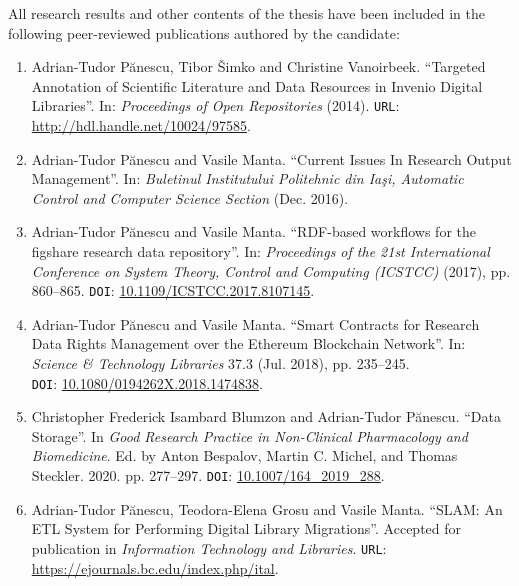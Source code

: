 All research results and other contents of the thesis have been included in the following peer-reviewed publications authored by the candidate:
\begin{enumerate}
    \item Adrian-Tudor P\u{a}nescu, Tibor \v{S}imko and Christine Vanoirbeek. ``Targeted Annotation of Scientific Literature and Data Resources in Invenio Digital Libraries''. In: \emph{Proceedings of Open Repositories} (2014). \texttt{URL}: \url{http://hdl.handle.net/10024/97585}.
    
    \item Adrian-Tudor P\u{a}nescu and Vasile Manta. ``Current Issues In Research Output Management''. In: \emph{Buletinul Institutului Politehnic din Ia\c{s}i, Automatic Control and Computer Science Section} (Dec. 2016).
    
    \item Adrian-Tudor P\u{a}nescu and Vasile Manta. ``RDF-based workflows for the figshare research data repository''. In: \emph{Proceedings of the  21st International Conference on System Theory, Control and Computing (ICSTCC)} (2017), pp. 860--865. \texttt{DOI}: \href{https://doi.org/10.1109/ICSTCC.2017.8107145}{10.1109/ICSTCC.2017.8107145}.
    
    \item Adrian-Tudor P\u{a}nescu and Vasile Manta. ``Smart Contracts for Research Data Rights Management over the Ethereum Blockchain Network''. In: \emph{Science \& Technology Libraries} 37.3 (Jul. 2018), pp. 235--245.\\\texttt{DOI}: \href{https://doi.org/10.1080/0194262X.2018.1474838}{10.1080/0194262X.2018.1474838}.
    
    \item Christopher Frederick Isambard Blumzon and Adrian-Tudor P\u{a}nescu. ``Data Storage''. In \emph{Good Research Practice in Non-Clinical Pharmacology and\\Biomedicine}. Ed. by Anton Bespalov, Martin C. Michel, and Thomas Steckler. 2020. pp. 277--297. \texttt{DOI}: \href{https://doi.org/10.1007/164\_2019\_288}{10.1007/164\_2019\_288}.
    
    \item Adrian-Tudor P\u{a}nescu, Teodora-Elena Grosu and Vasile Manta. ``SLAM: An ETL System for Performing Digital Library Migrations''. Accepted for publication in \emph{Information Technology and Libraries}. \texttt{URL}: \url{https://ejournals.bc.edu/index.php/ital}.
\end{enumerate}

